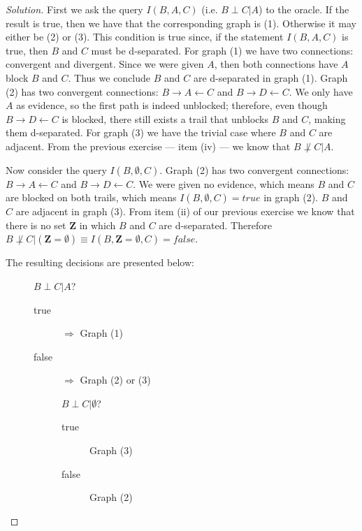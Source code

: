 \documentclass{amsart}
\theoremstyle{plain}
\renewcommand{\implies}{\Rightarrow}
\begin{document}
\begin{proof}[Solution]
  First we ask the query $I(B,A,C)$ (i.e. $B\perp C|A$) to the oracle. If the result is true, then
  we have that the corresponding graph is (1). Otherwise it may either be (2) or (3). This
  condition is true since, if the statement $I(B,A,C)$ is true, then $B$ and $C$ must be
  d-separated. For graph (1) we have two connections: convergent and divergent. Since we were given
  $A$, then both connections have $A$ block $B$ and $C$. Thus we conclude $B$ and $C$ are
  d-separated in graph (1). Graph (2) has two convergent connections: $B\to A\gets C$ and $B\to D
  \gets C$. We only have $A$ as evidence, so the first path is indeed unblocked; therefore, even
  though $B\to D\gets C$ is blocked, there still exists a trail that unblocks $B$ and $C$, making
  them d-separated. For graph (3) we have the trivial case where $B$ and $C$ are adjacent. From the
  previous exercise --- item (iv) --- we know that $B\not\perp C|A$.

  Now consider the query $I(B,\emptyset,C)$. Graph (2) has two convergent connections: $B\to A\gets
  C$ and $B\to D\gets C$. We were given no evidence, which means $B$ and $C$ are blocked on both
  trails, which means $I(B,\emptyset,C)=true$ in graph (2). $B$ and $C$ are adjacent in graph (3).
  From item (ii) of our previous exercise we know that there is no set $\mathbf{Z}$ in which $B$
  and $C$ are d-separated. Therefore $B\not\perp C|(\mathbf{Z}=\emptyset)\equiv I(B,\mathbf{Z}=
  \emptyset,C)=false$.

  The resulting decisions are presented below:

  \begin{description}
    \item[] $B\perp C|A$?
      \begin{description}
        \item[true] $\implies$ Graph (1)
        \item[false] $\implies$ Graph (2) or (3)
        \item[] $B\perp C|\emptyset$?
          \begin{description}
            \item[true] Graph (3)
            \item[false] Graph (2)
          \end{description}
      \end{description}
  \end{description}
\end{proof}

\newpage

\printbibliography[]
\end{document}
